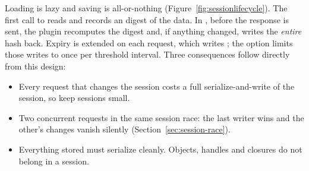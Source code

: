 Loading is lazy and saving is all-or-nothing (Figure~\ref{fig:sessionlifecycle}). The first call to  reads  and records an  digest of the data. In , before the response is sent, the plugin recomputes the digest and, if anything changed, writes the \emph{entire} hash back. Expiry is extended on each request, which writes ; the  option limits those writes to once per threshold interval.
Three consequences follow directly from this design:
\begin{itemize}
\item Every request that changes the session costs a full serialize-and-write of the session, so keep sessions small.
\item Two concurrent requests in the same session race: the last writer wins and the other's changes vanish silently (Section~\ref{sec:session-race}).
\item Everything stored must serialize cleanly. Objects, handles and closures do not belong in a session.
\end{itemize}

